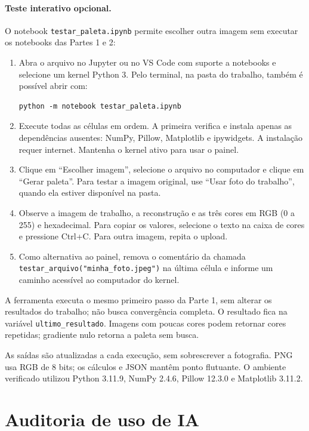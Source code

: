 \documentclass[12pt,a4paper]{article}
\begin{document}
\paragraph{Teste interativo opcional.}
O notebook \texttt{testar\_paleta.ipynb} permite escolher outra imagem
sem executar os notebooks das Partes 1 e 2:
\begin{enumerate}
\item Abra o arquivo no Jupyter ou no VS Code com suporte a notebooks
e selecione um kernel Python 3. Pelo terminal, na pasta do trabalho,
também é possível abrir com:
\begin{verbatim}
python -m notebook testar_paleta.ipynb
\end{verbatim}
\item Execute todas as células em ordem. A primeira verifica e instala
apenas as dependências ausentes: NumPy, Pillow, Matplotlib e ipywidgets.
A instalação requer internet. Mantenha o kernel ativo para usar o painel.
\item Clique em ``Escolher imagem'', selecione o arquivo no computador
e clique em ``Gerar paleta''. Para testar a imagem original, use
``Usar foto do trabalho'', quando ela estiver disponível na pasta.
\item Observe a imagem de trabalho, a reconstrução e as três cores em
RGB (0 a 255) e hexadecimal. Para copiar os valores, selecione o texto
na caixa de cores e pressione Ctrl+C. Para outra imagem, repita o upload.
\item Como alternativa ao painel, remova o comentário da chamada
\texttt{testar\_arquivo("minha\_foto.jpeg")} na última célula e informe
um caminho acessível ao computador do kernel.
\end{enumerate}
A ferramenta executa o mesmo primeiro passo da Parte 1, sem alterar os
resultados do trabalho; não busca convergência completa. O resultado fica
na variável \texttt{ultimo\_resultado}. Imagens com poucas cores podem
retornar cores repetidas; gradiente nulo retorna a paleta sem busca.

As saídas são atualizadas a cada execução, sem sobrescrever a fotografia.
PNG usa RGB de 8 bits; os cálculos e JSON mantêm ponto flutuante.
O ambiente verificado utilizou Python 3.11.9, NumPy 2.4.6, Pillow 12.3.0
e Matplotlib 3.11.2.

\appendix
\section{Auditoria de uso de IA}
\end{document}
